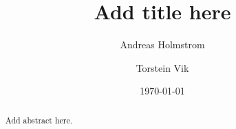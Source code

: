 
\title{Add title here}

\author{Andreas Holmstrom}

\author{Torstein Vik}


\keywords{}

\date{\today}

\dedicatory{}

\begin{abstract}
Add abstract here.
\end{abstract}

\maketitle

\setcounter{tocdepth}{2}
\tableofcontents

\newpage
